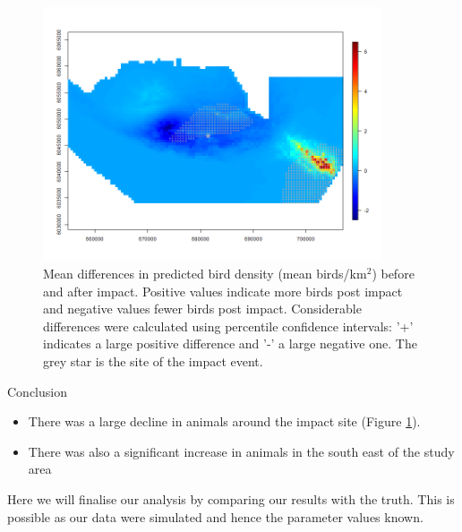 \begin{figure}[h]
  \centering
  \includegraphics[width=10cm]{danish/differencePlot.png}
  \tiny
  \caption{Mean differences in predicted bird density (mean birds/km$^2$) before and after impact.  Positive values indicate more birds post impact and negative values fewer birds post impact.  Considerable differences were calculated using percentile confidence intervals: '+' indicates a large positive difference and '-' a large negative one.  The grey star is the site of the impact event.}
  \label{fig:diffs}
\end{figure}

\begin{block}{Conclusion}
 \begin{itemize}
  \item There was a large decline in animals around the impact site (Figure \ref{fig:diffs}).
  \item There was also a significant increase in animals in the south east of the study area
\end{itemize}
\end{block}


Here we will finalise our analysis by comparing our results with the truth. This is possible as our data were simulated and hence the parameter values known. \\
